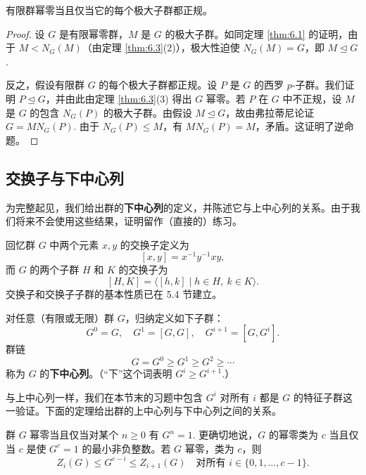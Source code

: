 \begin{proposition}\label{pro:6.7}
有限群幂零当且仅当它的每个极大子群都正规。
\end{proposition}

\begin{proof}
设 \(G\) 是有限幂零群，\(M\) 是 \(G\) 的极大子群。如同定理 \ref{thm:6.1} 的证明，由于 \(M < N_G(M)\)（由定理 \ref{thm:6.3}(2)），极大性迫使 \(N_G(M) = G\)，即 \(M \trianglelefteq G\).

反之，假设有限群 \(G\) 的每个极大子群都正规。设 \(P\) 是 \(G\) 的西罗 \(p\)-子群。我们证明 \(P \trianglelefteq G\)，并由此由定理 \ref{thm:6.3}(3) 得出 \(G\) 幂零。若 \(P\) 在 \(G\) 中不正规，设 \(M\) 是 \(G\) 的包含 \(N_G(P)\) 的极大子群。由假设 \(M \trianglelefteq G\)，故由弗拉蒂尼论证 \(G = MN_G(P)\). 由于 \(N_G(P) \leq M\)，有 \(MN_G(P) = M\)，矛盾。这证明了逆命题。
\end{proof}

\subsection*{交换子与下中心列}

为完整起见，我们给出群的\textbf{下中心列}的定义，并陈述它与上中心列的关系。由于我们将来不会使用这些结果，证明留作（直接的）练习。

回忆群 \(G\) 中两个元素 \(x, y\) 的交换子定义为
\[
[x, y] = x^{-1}y^{-1}xy,
\]
而 \(G\) 的两个子群 \(H\) 和 \(K\) 的交换子为
\[
[H, K] = \langle [h, k] \mid h \in H,\ k \in K \rangle.
\]
交换子和交换子子群的基本性质已在 5.4 节建立。

\begin{definition}
对任意（有限或无限）群 \(G\)，归纳定义如下子群：
\[
G^0 = G,\quad G^1 = [G, G],\quad G^{i+1} = [G, G^i].
\]
群链
\[
G = G^0 \geq G^1 \geq G^2 \geq \cdots
\]
称为 \(G\) 的\textbf{下中心列}。（“下”这个词表明 \(G^i \geq G^{i+1}\).）
\end{definition}

与上中心列一样，我们在本节末的习题中包含 \(G^i\) 对所有 \(i\) 都是 \(G\) 的特征子群这一验证。下面的定理给出群的上中心列与下中心列之间的关系。

\begin{theorem}\label{thm:6.8}
群 \(G\) 幂零当且仅当对某个 \(n \geq 0\) 有 \(G^n = 1\). 更确切地说，\(G\) 的幂零类为 \(c\) 当且仅当 \(c\) 是使 \(G^c = 1\) 的最小非负整数。若 \(G\) 幂零，类为 \(c\)，则
\[
Z_i(G) \leq G^{c-i} \leq Z_{i+1}(G) \quad \text{对所有 } i \in \{0, 1, \ldots, c-1\}.
\]
\end{theorem}

